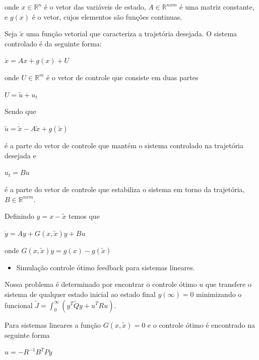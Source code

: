 \documentclass[12pt, a4paper]{article}
\begin{document}
onde $x \in \mathbb{R}^n$ é o vetor das variáveis de estado, $A \in \mathbb{R}^{nxm}$ é uma matriz constante, e $g(x)$ é o vetor, cujos elementos são funções continuas. \

Seja $\tilde{x}$ uma função vetorial que caracteriza a trajetória desejada. O sistema controlado é da seguinte forma:

\begin{center}
$\dot x = Ax + g(x) + U$
\end{center}

onde $U \in \mathbb{R}^m$ é o vetor de controle que consiste em duas partes

\begin{center}
$U = \tilde{u} + u_t$
\end{center}

Sendo que 

\begin{center}
$\tilde{u} = \dot{\tilde{x}} -A\tilde{x} + g(\tilde{x})$
\end{center}

é a parte do vetor de controle que mantém o sistema controlado na trajetória desejada e

\begin{center}
$u_t = Bu$
\end{center}

é a parte do vetor de controle que estabiliza o sistema em torno da trajetória, $B \in \mathbb{R}^{nxm}$.\

Definindo $y = x - \tilde{x}$ temos que

\begin{center}
$\dot y = Ay + G(x,\tilde{x})y + Bu$
\end{center}

onde $G(x,\tilde{x})y = g(x) - g(\tilde{x})$

\begin{itemize}
\item Simulação controle ótimo feedback para sistemas lineares.
\end{itemize}

Nossa problema é determinado por encontrar o controle ótimo $u$ que transfere o sistema de qualquer estado inicial ao estado final $y(\infty) = 0$ minimizando o funcional $\tilde{J} = \int^{\infty}_{0} (y^T\tilde{Q}y + u^TRu)$.\

Para sistemas lineares a função $G(x, \tilde{x}) = 0$ e o controle ótimo é encontrado na seguinte forma

\begin{center}
$ u = -R^{-1}B^TPy$
\end{center}
\end{document}
